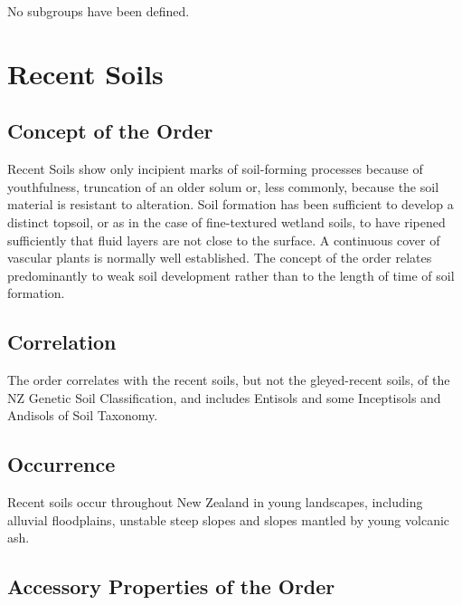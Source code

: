 \documentclass[
  letterpaper,
  DIV=11,
  numbers=noendperiod]{scrreprt}
\begin{document}
No subgroups have been defined.


\hypertarget{sec-ord-R}{%
\chapter{Recent Soils}\label{sec-ord-R}}

\hypertarget{sec-con-R}{%
\section{Concept of the Order}\label{sec-con-R}}

Recent Soils show only incipient marks of soil-forming processes because
of youthfulness, truncation of an older solum or, less commonly, because
the soil material is resistant to alteration. Soil formation has been
sufficient to develop a distinct topsoil, or as in the case of
fine-textured wetland soils, to have ripened sufficiently that fluid
layers are not close to the surface. A continuous cover of vascular
plants is normally well established. The concept of the order relates
predominantly to weak soil development rather than to the length of time
of soil formation.

\hypertarget{sec-cor-R}{%
\section{Correlation}\label{sec-cor-R}}

The order correlates with the recent soils, but not the gleyed-recent
soils, of the NZ Genetic Soil Classification, and includes Entisols and
some Inceptisols and Andisols of Soil Taxonomy.

\hypertarget{sec-occ-R}{%
\section{Occurrence}\label{sec-occ-R}}

Recent soils occur throughout New Zealand in young landscapes, including
alluvial floodplains, unstable steep slopes and slopes mantled by young
volcanic ash.

\hypertarget{sec-acc-R}{%
\section{Accessory Properties of the Order}\label{sec-acc-R}}
\end{document}
